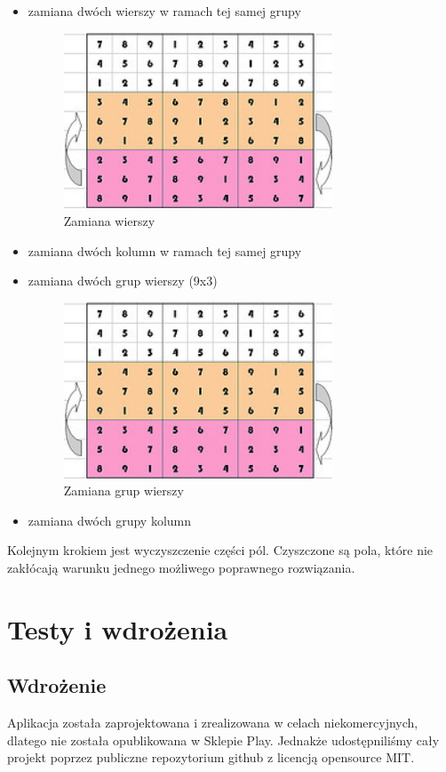 \documentclass[a4paper, 11pt]{article}
\begin{document}
\begin{itemize}
	\item zamiana dwóch wierszy w ramach tej samej grupy
	\begin{figure}[H]
		\centering
		\includegraphics[width=8cm]{zrzuty/shuffle.png}
		\caption{Zamiana wierszy}
		\label{fig:szuffle1}
	\end{figure}
	\item zamiana dwóch kolumn w ramach tej samej grupy
	\item zamiana dwóch grup wierszy (9x3)
	\begin{figure}[H]
		\centering
		\includegraphics[width=8cm]{zrzuty/szufflee.png}
		\caption{Zamiana grup wierszy}
		\label{fig:szuffle2}
	\end{figure}
	\item zamiana dwóch grupy kolumn
\end{itemize}
Kolejnym krokiem jest wyczyszczenie części pól. Czyszczone są pola, które nie zakłócają warunku jednego możliwego poprawnego rozwiązania.
\vfill
\newpage
\section{Testy i wdrożenia}
\subsection{Wdrożenie}
Aplikacja została zaprojektowana i zrealizowana w celach niekomercyjnych, dlatego nie została opublikowana w Sklepie Play. Jednakże udostępniliśmy cały projekt poprzez publiczne repozytorium github z licencją opensource MIT.
\end{document}
